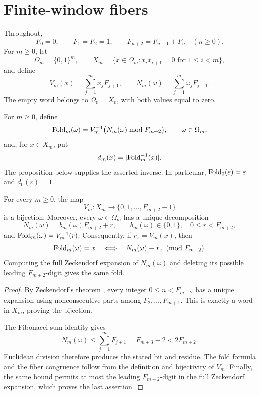 \section{Finite-window fibers}\label{sec:preliminaries}

Throughout,
\[
 F_0=0,\qquad F_1=F_2=1,\qquad F_{n+2}=F_{n+1}+F_n\quad(n\ge0).
\]
For \(m\ge0\), let
\[
 \Omega_m=\{0,1\}^m,
 \qquad
 X_m=\{x\in\Omega_m:x_ix_{i+1}=0\text{ for }1\le i<m\},
\]
and define
\[
 V_m(x)=\sum_{j=1}^m x_jF_{j+1},
 \qquad
 N_m(\omega)=\sum_{j=1}^m\omega_jF_{j+1}.
\]
The empty word belongs to \(\Omega_0=X_0\), with both values equal to zero.

\begin{definition}
\label{def:fold-map}
For \(m\ge0\), define
\[
 \mathrm{Fold}_m(\omega)=
 V_m^{-1}\bigl(N_m(\omega)\bmod F_{m+2}\bigr),
 \qquad \omega\in\Omega_m,
\]
and, for \(x\in X_m\), put
\[
 d_m(x)=\lvert \mathrm{Fold}_m^{-1}(x) \rvert.
\]
The proposition below supplies the asserted inverse.  In particular,
\(\mathrm{Fold}_0(\varepsilon)=\varepsilon\) and \(d_0(\varepsilon)=1\).
\end{definition}

\begin{proposition}
\label{prop:Vm-bijection}
\label{prop:single-overflow}
\label{cor:residue-characterization}
For every \(m\ge0\), the map
\[
 V_m:X_m\longrightarrow\{0,1,\ldots,F_{m+2}-1\}
\]
is a bijection.  Moreover, every \(\omega\in\Omega_m\) has a unique
decomposition
\[
 N_m(\omega)=b_m(\omega)F_{m+2}+r,
 \qquad b_m(\omega)\in\{0,1\},\quad 0\le r<F_{m+2},
\]
and \(\mathrm{Fold}_m(\omega)=V_m^{-1}(r)\).  Consequently, if
\(r_x=V_m(x)\), then
\[
 \mathrm{Fold}_m(\omega)=x
 \quad\Longleftrightarrow\quad
 N_m(\omega)\equiv r_x\pmod{F_{m+2}}.
\]
Computing the full Zeckendorf expansion of \(N_m(\omega)\) and deleting its
possible leading \(F_{m+2}\)-digit gives the same fold.
\end{proposition}

\begin{proof}
By Zeckendorf's theorem \cite{Zeckendorf1972}, every integer
\(0\le n<F_{m+2}\) has a unique expansion using nonconsecutive parts among
\(F_2,\ldots,F_{m+1}\).  This is exactly a word in \(X_m\), proving the
bijection.

The Fibonacci sum identity gives
\[
 N_m(\omega)\le\sum_{j=1}^mF_{j+1}=F_{m+3}-2<2F_{m+2}.
\]
Euclidean division therefore produces the stated bit and residue.  The fold
formula and the fiber congruence follow from the definition and bijectivity
of \(V_m\).  Finally, the same bound permits at most the leading
\(F_{m+2}\)-digit in the full Zeckendorf expansion, which proves the last
assertion.
\end{proof}
